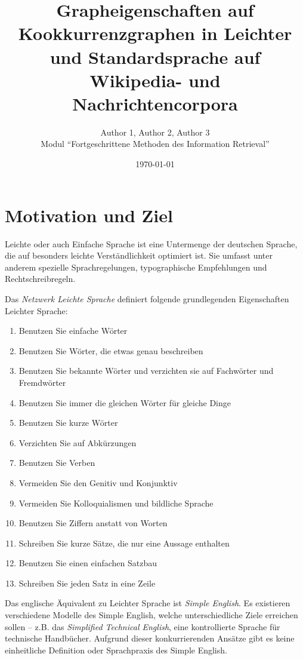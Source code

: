 \documentclass[11pt, a4paper]{article}
\title{Grapheigenschaften auf Kookkurrenzgraphen in Leichter und Standardsprache auf Wikipedia- und Nachrichtencorpora}
\author{Author 1, Author 2, Author 3\\Modul "`Fortgeschrittene Methoden des Information Retrieval"'}
\date{\today}
\begin{document}
\maketitle
\tableofcontents

\section{Motivation und Ziel}

Leichte oder auch Einfache Sprache ist eine Untermenge der deutschen Sprache,
die auf besonders leichte Verst\"andlichkeit optimiert ist. Sie umfasst unter
anderem spezielle Sprachregelungen, typographische Empfehlungen und
Rechtschreibregeln. 

Das \emph{Netzwerk Leichte Sprache} definiert folgende grundlegenden
Eigenschaften Leichter Sprache:

\begin{enumerate}
	\item Benutzen Sie einfache W\"orter
	\item Benutzen Sie W\"orter, die etwas genau beschreiben
	\item Benutzen Sie bekannte W\"orter und verzichten sie auf Fachw\"orter und Fremdw\"orter
	\item Benutzen Sie immer die gleichen W\"orter f\"ur gleiche Dinge
	\item Benutzen Sie kurze W\"orter
	\item Verzichten Sie auf Abk\"urzungen
	\item Benutzen Sie Verben
	\item Vermeiden Sie den Genitiv und Konjunktiv
	\item Vermeiden Sie Kolloquialismen und bildliche Sprache
	\item Benutzen Sie Ziffern anstatt von Worten
	\item Schreiben Sie kurze S\"atze, die nur eine Aussage enthalten
	\item Benutzen Sie einen einfachen Satzbau
	\item Schreiben Sie jeden Satz in eine Zeile
\end{enumerate}

Das englische \"Aquivalent zu Leichter Sprache ist \emph{Simple English}. Es
existieren verschiedene Modelle des Simple English, welche unterschiedliche
Ziele erreichen sollen -- z.B. das \emph{Simplified Technical English}, eine
kontrollierte Sprache f\"ur technische Handb\"ucher. Aufgrund dieser
konkurrierenden Ans\"atze gibt es keine einheitliche Definition oder
Sprachpraxis des Simple English. %
\end{document}
